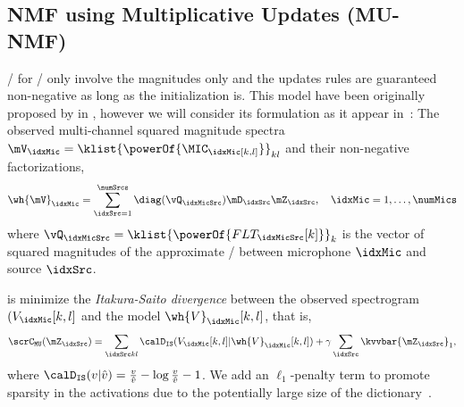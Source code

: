 \subsection{NMF using Multiplicative Updates (MU-NMF)}\label{sec:separake:mu}
\MUdef/ for \NMF/ only involve the magnitudes only and the updates rules are guaranteed non-negative as long as the initialization is.
This model have been originally proposed by in , however we will consider its formulation as it appear in~:
The observed multi-channel squared magnitude spectra $\mV_\idxMic = \klist{\powerOf{\MIC_\idxMic[k,l]}}_{kl}$ and their non-negative factorizations,
\begin{equation}
    \label{eq:mu_nmf}
    \wh{\mV}_\idxMic = \sum_{\idxSrc=1}^{\numSrcs} \diag(\vQ_{\idxMicSrc}) \mD_\idxSrc \mZ_\idxSrc , \quad \idxMic=1,\ldots,\numMics
\end{equation}
where $\vQ_{\idxMicSrc} = \klist{\powerOf{FLT_{\idxMicSrc}[k]}}_k$ is the vector of squared magnitudes of the approximate \RTF/ between microphone $\idxMic$ and source $\idxSrc$.

 is minimize the \textit{Itakura-Saito divergence}  between the observed spectrogram $(V_{\idxMic}[k,l]$ and the model $\wh{V}_{\idxMic}[k,l]$, that is,
\begin{equation}
    \scrC_{\mathtt{MU}}(\mZ_\idxSrc) = \sum_{\idxSrc k l} \calD_{\mathtt{IS}}(V_{\idxMic}[k,l] | \wh{V}_{\idxMic}[k,l])
    + \gamma \sum_\idxSrc \kvvbar{\mZ_\idxSrc}_1,
\end{equation}
where $\calD_{\mathtt{IS}}( v | \hat{v} ) = \frac{v}{\hat{v}} - \log \frac{v}{\hat{v}} - 1$.
We add an $\ell_1$-penalty term to promote sparsity in the activations due to the potentially large size of the dictionary~.

